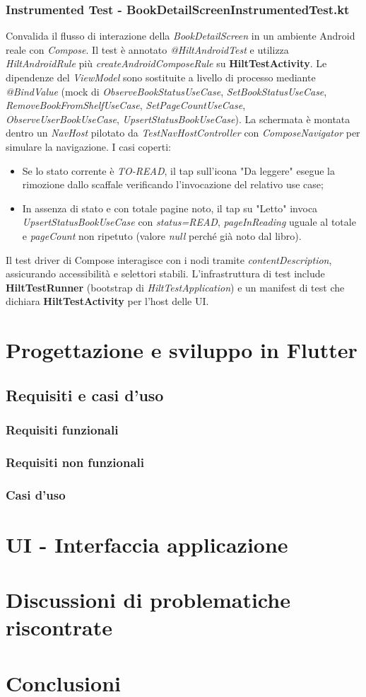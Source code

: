 \documentclass{article}
\begin{document}
\subsubsection{Instrumented Test - BookDetailScreenInstrumentedTest.kt}
Convalida il flusso di interazione della \textit{BookDetailScreen} in un ambiente Android reale con \textit{Compose}. Il test è annotato \textit{@HiltAndroidTest} e utilizza \textit{HiltAndroidRule} più \textit{createAndroidComposeRule} su \textbf{HiltTestActivity}. Le dipendenze del \textit{ViewModel} sono sostituite a livello di processo mediante \textit{@BindValue} (mock di \textit{ObserveBookStatusUseCase}, \textit{SetBookStatusUseCase}, \textit{RemoveBookFromShelfUseCase}, \textit{SetPageCountUseCase}, \textit{ObserveUserBookUseCase}, \textit{UpsertStatusBookUseCase}).
La schermata è montata dentro un \textit{NavHost} pilotato da \textit{TestNavHostController} con \textit{ComposeNavigator} per simulare la navigazione.
I casi coperti:
\begin{itemize}
  \item Se lo stato corrente è \textit{TO-READ}, il tap sull’icona "Da leggere" esegue la rimozione dallo scaffale verificando l’invocazione del relativo use case;
  \item In assenza di stato e con totale pagine noto, il tap su "Letto" invoca \textit{UpsertStatusBookUseCase} con \textit{status=READ}, \textit{pageInReading} uguale al totale e \textit{pageCount} non ripetuto (valore \textit{null} perché già noto dal libro).
\end{itemize}
Il test driver di Compose interagisce con i nodi tramite \textit{contentDescription}, 
assicurando accessibilità e selettori stabili. L’infrastruttura di test include \textbf{HiltTestRunner} (bootstrap di \textit{HiltTestApplication}) 
e un manifest di test che dichiara \textbf{HiltTestActivity} per l’host delle UI.

\section{Progettazione e sviluppo in Flutter}
\subsection{Requisiti e casi d'uso}
\subsubsection{Requisiti funzionali}
\subsubsection{Requisiti non funzionali}
\subsubsection{Casi d'uso}

\section{UI - Interfaccia applicazione}

\section{Discussioni di problematiche riscontrate}

\section{Conclusioni}
\end{document}
